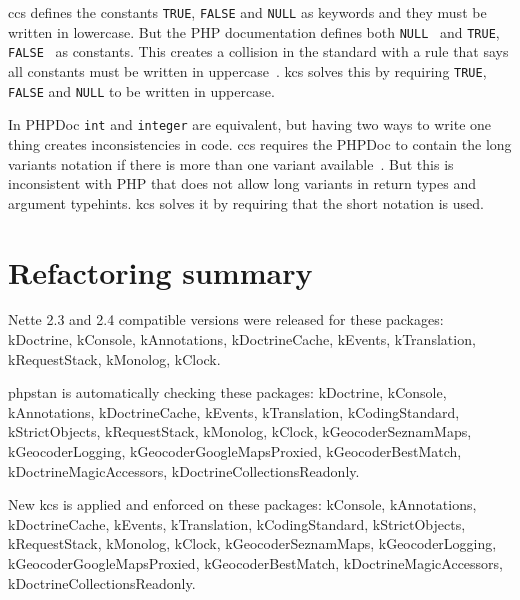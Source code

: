 \gls{ccs} defines the constants \lstinline{TRUE}, \lstinline{FALSE} and \lstinline{NULL} as keywords and they must be written in lowercase. But the PHP documentation defines both \lstinline{NULL}~\cite{php:manual:null} and \lstinline{TRUE}, \lstinline{FALSE}~\cite{php:manual:boolean} as constants. This creates a collision in the standard with a rule that says all constants must be written in uppercase~\cite{consistence:coding-standard}. \gls{kcs} solves this by requiring \lstinline{TRUE}, \lstinline{FALSE} and \lstinline{NULL} to be written in uppercase.


In PHPDoc \lstinline{int} and \lstinline{integer} are equivalent, but having two ways to write one thing creates inconsistencies in code. \gls{ccs} requires the PHPDoc to contain the long variants notation if there is more than one variant available~\cite{consistence:coding-standard}. But this is inconsistent with PHP that does not allow long variants in return types and argument typehints. \gls{kcs} solves it by requiring that the short notation is used.

\section{Refactoring summary}

Nette 2.3 and 2.4 compatible versions were released for these packages: \gls{kDoctrine}, \gls{kConsole}, \gls{kAnnotations}, \gls{kDoctrineCache}, \gls{kEvents}, \gls{kTranslation}, \gls{kRequestStack}, \gls{kMonolog}, \gls{kClock}.

\gls{phpstan} is automatically checking these packages: \gls{kDoctrine}, \gls{kConsole}, \gls{kAnnotations}, \gls{kDoctrineCache}, \gls{kEvents}, \gls{kTranslation}, \gls{kCodingStandard}, \gls{kStrictObjects}, \gls{kRequestStack}, \gls{kMonolog}, \gls{kClock}, \gls{kGeocoderSeznamMaps}, \gls{kGeocoderLogging}, \gls{kGeocoderGoogleMapsProxied}, \gls{kGeocoderBestMatch}, \gls{kDoctrineMagicAccessors}, \gls{kDoctrineCollectionsReadonly}.

New \acrlong{kcs} is applied and enforced on these packages:  \gls{kConsole}, \gls{kAnnotations}, \gls{kDoctrineCache}, \gls{kEvents}, \gls{kTranslation}, \gls{kCodingStandard}, \gls{kStrictObjects}, \gls{kRequestStack}, \gls{kMonolog}, \gls{kClock}, \gls{kGeocoderSeznamMaps}, \gls{kGeocoderLogging}, \gls{kGeocoderGoogleMapsProxied}, \gls{kGeocoderBestMatch}, \gls{kDoctrineMagicAccessors}, \gls{kDoctrineCollectionsReadonly}.
